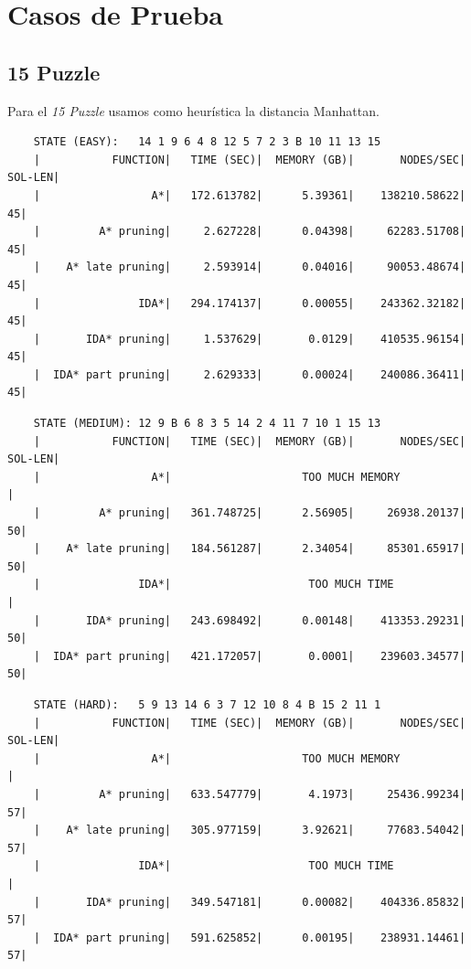 \documentclass[a4paper,10pt]{article}
\begin{document}
\section{Casos de Prueba}
  \subsection{15 Puzzle}
    Para el \textit{15 Puzzle} usamos como heur\'istica la distancia Manhattan.
    
    \begin{verbatim}
    STATE (EASY):   14 1 9 6 4 8 12 5 7 2 3 B 10 11 13 15
    |           FUNCTION|   TIME (SEC)|  MEMORY (GB)|       NODES/SEC|    SOL-LEN|
    |                 A*|   172.613782|      5.39361|    138210.58622|         45|
    |         A* pruning|     2.627228|      0.04398|     62283.51708|         45|
    |    A* late pruning|     2.593914|      0.04016|     90053.48674|         45|
    |               IDA*|   294.174137|      0.00055|    243362.32182|         45|
    |       IDA* pruning|     1.537629|       0.0129|    410535.96154|         45|
    |  IDA* part pruning|     2.629333|      0.00024|    240086.36411|         45|
    \end{verbatim}        
    
    \begin{verbatim}  
    STATE (MEDIUM): 12 9 B 6 8 3 5 14 2 4 11 7 10 1 15 13                                                                                       
    |           FUNCTION|   TIME (SEC)|  MEMORY (GB)|       NODES/SEC|    SOL-LEN|
    |                 A*|                    TOO MUCH MEMORY                     |
    |         A* pruning|   361.748725|      2.56905|     26938.20137|         50|
    |    A* late pruning|   184.561287|      2.34054|     85301.65917|         50|
    |               IDA*|                     TOO MUCH TIME                      |
    |       IDA* pruning|   243.698492|      0.00148|    413353.29231|         50|
    |  IDA* part pruning|   421.172057|       0.0001|    239603.34577|         50|
    \end{verbatim}

    \begin{verbatim}  
    STATE (HARD):   5 9 13 14 6 3 7 12 10 8 4 B 15 2 11 1                                                                                     
    |           FUNCTION|   TIME (SEC)|  MEMORY (GB)|       NODES/SEC|    SOL-LEN|
    |                 A*|                    TOO MUCH MEMORY                     |  
    |         A* pruning|   633.547779|       4.1973|     25436.99234|         57|
    |    A* late pruning|   305.977159|      3.92621|     77683.54042|         57|
    |               IDA*|                     TOO MUCH TIME                      |
    |       IDA* pruning|   349.547181|      0.00082|    404336.85832|         57|
    |  IDA* part pruning|   591.625852|      0.00195|    238931.14461|         57|
      \end{verbatim}
\end{document}
